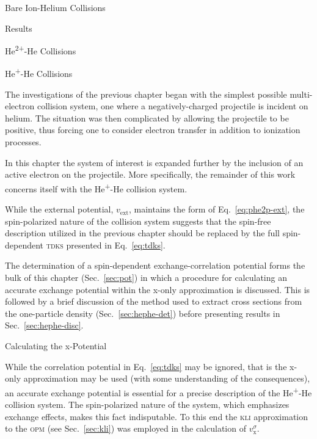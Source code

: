 \documentclass[letterpaper, 11 pt]{report}
\begin{document}
\begin{chapter}{Bare Ion-Helium Collisions \label{chap:p-he2p-he}}
\begin{section}{Results \label{sec:phe2p-res}}
\begin{subsection}{\texorpdfstring{He\textsuperscript{2+}}{He2+}-He Collisions
                         \label{sec:he2phe-res}}
      \end{subsection}

   \end{section}

\end{chapter}

\begin{chapter}{\texorpdfstring{He\textsuperscript{+}}{He+}-He Collisions \label{chap:hephe}}

   The investigations of the previous chapter began with the simplest possible multi-electron collision
   system, one where a negatively-charged projectile is incident on helium. The situation was then
   complicated by allowing the projectile to be positive, thus forcing one to consider electron transfer
   in addition to ionization processes.

   In this chapter the system of interest is expanded further by the inclusion of an active electron on
   the projectile. More specifically, the remainder of this work concerns itself with the
   He\textsuperscript{+}-He collision system.

   While the external potential, $v_\mathrm{ext}$, maintains the form of Eq.~\eqref{eq:phe2p-ext}, the
   spin-polarized nature of the collision system suggests that the spin-free description utilized in the
   previous chapter should be replaced by the full spin-dependent \textsc{tdks} presented in
   Eq.~\eqref{eq:tdks}.

   The determination of a spin-dependent exchange-correlation potential forms the bulk of this chapter
   (Sec.~\ref{sec:pot}) in which a procedure for calculating an accurate exchange potential within the
   x-only approximation is discussed. This is followed by a brief discussion of the method used to
   extract cross sections from the one-particle density (Sec.~\ref{sec:hephe-det}) before presenting
   results in Sec.~\ref{sec:hephe-disc}.

   \begin{section}{Calculating the x-Potential \label{sec:pot}}

      While the correlation potential in Eq.~\ref{eq:tdks} may be ignored, that is the x-only
      approximation may be used (with some understanding of the consequences), an accurate exchange
      potential is essential for a precise description of the He\textsuperscript{+}-He collision
      system. The spin-polarized nature of the system, which emphasizes exchange effects, makes this
      fact indisputable. To this end the \textsc{kli} approximation to the \textsc{opm}
      (see Sec.~\ref{sec:kli}) was employed in the calculation of $v^\sigma_\mathrm{x}$.


\end{section}
\end{chapter}
\end{document}
